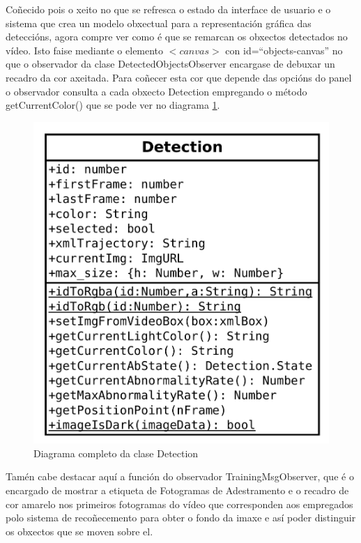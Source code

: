         Coñecido pois o xeito no que se refresca o estado da interface de usuario e o sistema que crea un 
        modelo obxectual para a representación gráfica das deteccións, agora compre ver como é que se 
        remarcan os obxectos detectados no vídeo. Isto faise mediante o elemento $<canvas>$ con
        id=``objects-canvas'' no que o observador da clase DetectedObjectsObserver encargase de debuxar
        un recadro da cor axeitada. Para coñecer esta cor que depende das opcións do panel o observador
        consulta a cada obxecto Detection empregando o método getCurrentColor() que se pode ver no 
        diagrama \ref{fig:DetectionClass}.

        
        \begin{figure}[htp]
        \begin{center}
            \includegraphics[scale=0.5]{figures/DetectionClass.pdf}
            \caption{Diagrama completo da clase Detection}
        \label{fig:DetectionClass}
        \end{center}
        \end{figure}
        
        Tamén cabe destacar aquí a función do observador TrainingMsgObserver, que é o encargado de 
        mostrar a etiqueta de Fotogramas de Adestramento e o recadro de cor amarelo nos primeiros 
        fotogramas do vídeo que corresponden aos empregados polo sistema de recoñecemento para obter o 
        fondo da imaxe e así poder distinguir os obxectos que se moven sobre el.
        
